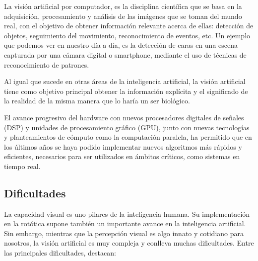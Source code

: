

La visión artificial por computador, es la disciplina científica que se basa en
la adquisición, procesamiento y análisis de las imágenes que se toman del mundo
real, con el objetivo de obtener información relevante acerca de ellas:
detección de objetos, seguimiento del movimiento, reconocimiento de eventos,
etc. Un ejemplo que podemos ver en nuestro día a día, es la detección de caras
en una escena capturada por una cámara digital o smartphone, mediante el uso de
técnicas de reconocimiento de patrones.

Al igual que sucede en otras áreas de la inteligencia artificial, la visión
artificial tiene como objetivo principal obtener la información explícita y el
significado de la realidad de la misma manera que lo haría un ser biológico.

El avance progresivo del hardware con nuevos procesadores digitales de señales
(DSP) y unidades de procesamiento gráfico (GPU), junto con nuevas tecnologías y
planteamientos de cómputo como la computación paralela, ha permitido que en los
últimos años se haya podido implementar nuevos algoritmos más rápidos y
eficientes, necesarios para ser utilizados en ámbitos críticos, como sistemas
en tiempo real.

\subsection{Dificultades}
La capacidad visual es uno pilares de la inteligencia humana. Su implementación
en la rotótica supone también un importante avance en la inteligencia
artificial. Sin embargo, mientras que la percepción visual es algo innato y
cotidiano para nosotros, la visión artificial es muy compleja y conlleva muchas
dificultades. Entre las principales dificultades, destacan:

